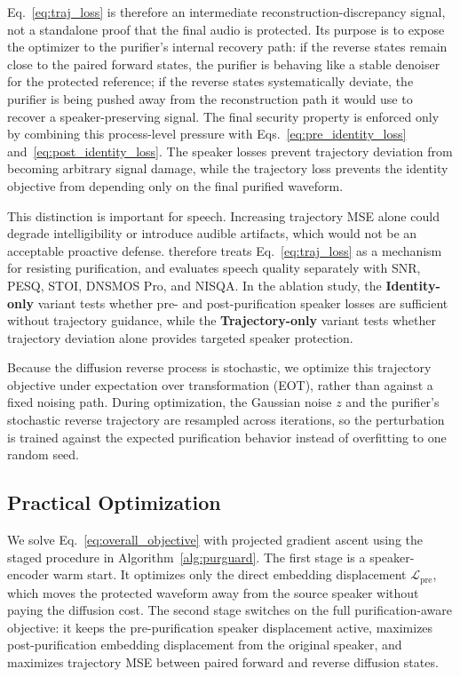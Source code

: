 Eq.~\eqref{eq:traj_loss} is therefore an intermediate reconstruction-discrepancy signal, not a standalone proof that the final audio is protected. 
Its purpose is to expose the optimizer to the purifier's internal recovery path: if the reverse states remain close to the paired forward states, the purifier is behaving like a stable denoiser for the protected reference; if the reverse states systematically deviate, the purifier is being pushed away from the reconstruction path it would use to recover a speaker-preserving signal. 
The final security property is enforced only by combining this process-level pressure with Eqs.~\eqref{eq:pre_identity_loss} and~\eqref{eq:post_identity_loss}. 
The speaker losses prevent trajectory deviation from becoming arbitrary signal damage, while the trajectory loss prevents the identity objective from depending only on the final purified waveform.

This distinction is important for speech. Increasing trajectory MSE alone could degrade intelligibility or introduce audible artifacts, which would not be an acceptable proactive defense. 
\method{} therefore treats Eq.~\eqref{eq:traj_loss} as a mechanism for resisting purification, and evaluates speech quality separately with SNR, PESQ, STOI, DNSMOS Pro, and NISQA. 
In the ablation study, the \textbf{Identity-only} variant tests whether pre- and post-purification speaker losses are sufficient without trajectory guidance, while the \textbf{Trajectory-only} variant tests whether trajectory deviation alone provides targeted speaker protection.

Because the diffusion reverse process is stochastic, we optimize this trajectory objective under expectation over transformation (EOT), rather than against a fixed noising path. 
During optimization, the Gaussian noise $z$ and the purifier's stochastic reverse trajectory are resampled across iterations, 
so the perturbation is trained against the expected purification behavior instead of overfitting to one random seed.

\subsection{Practical Optimization}

We solve Eq.~\eqref{eq:overall_objective} with projected gradient ascent using the staged procedure in Algorithm~\ref{alg:purguard}. 
The first stage is a speaker-encoder warm start. It optimizes only the direct embedding displacement
\(\mathcal{L}_{\text{pre}}\), which moves the protected waveform away from the source speaker without paying the diffusion cost. 
The second stage switches on the full purification-aware objective: 
it keeps the pre-purification speaker displacement active, maximizes post-purification embedding displacement from the original speaker, and maximizes trajectory MSE between paired forward and reverse diffusion states.

